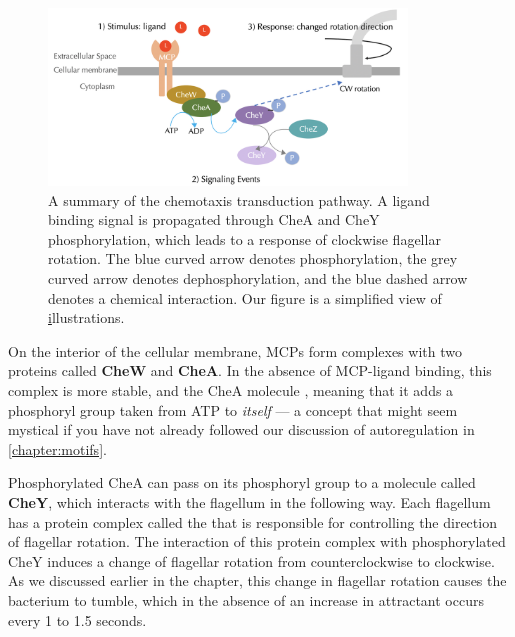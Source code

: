 \begin{figure}[h]
\centering
\mySfFamily
\includegraphics[width = 0.85\textwidth]{../images/chemotaxisphosnew.png}
\caption{A summary of the chemotaxis transduction pathway. A ligand binding signal is propagated through CheA and CheY phosphorylation, which leads to a response of clockwise flagellar rotation. The blue curved arrow denotes phosphorylation, the grey curved arrow denotes dephosphorylation, and the blue dashed arrow denotes a chemical interaction. Our figure is a simplified view of \href{http://chemotaxis.biology.utah.edu/Parkinson_Lab/projects/ecolichemotaxis/ecolichemotaxis.html} illustrations.}
\label{fig:chemotaxisphosnew}
\end{figure}


On the interior of the cellular membrane, MCPs form complexes with two proteins called \textbf{CheW} and \textbf{CheA}. In the absence of MCP-ligand binding, this complex is more stable, and the CheA molecule , meaning that it adds a phosphoryl group taken from ATP to \textit{itself} --- a concept that might seem mystical if you have not already followed our discussion of autoregulation in \autoref{chapter:motifs}.

Phosphorylated CheA can pass on its phosphoryl group to a molecule called \textbf{CheY}, which interacts with the flagellum in the following way. Each flagellum has a protein complex called the  that is responsible for controlling the direction of flagellar rotation. The interaction of this protein complex with phosphorylated CheY induces a change of flagellar rotation from counter\-clockwise to clockwise. As we discussed earlier in the chapter, this change in flagellar rotation causes the bacterium to tumble, which in the absence of an increase in attractant occurs every 1 to 1.5 seconds.

